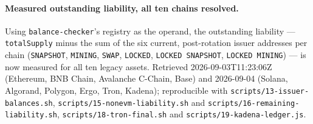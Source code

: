 \paragraph{Measured outstanding liability, all ten chains resolved.} Using \texttt{balance-\allowbreak{}checker}'s
registry as the operand, the outstanding liability --- \texttt{totalSupply} minus the sum of the six
current, post-rotation issuer addresses per chain (\texttt{SNAPSHOT}, \texttt{MINING},
\texttt{SWAP}, \texttt{LOCKED}, \texttt{LOCKED SNAPSHOT}, \texttt{LOCKED MINING}) --- is now measured
for all ten legacy assets. Retrieved
2026-09-03T11:23:06Z (Ethereum, BNB Chain, Avalanche C-Chain, Base) and 2026-09-04 (Solana, Algorand, Polygon, Ergo, Tron, Kadena); reproducible
with \texttt{scripts/\allowbreak{}13-issuer-balances.\allowbreak{}sh}, \texttt{scripts/\allowbreak{}15-nonevm-liability.\allowbreak{}sh} and
\texttt{scripts/\allowbreak{}16-remaining-liability.\allowbreak{}sh},
\texttt{scripts/\allowbreak{}18-tron-final.\allowbreak{}sh} and \texttt{scripts/\allowbreak{}19-kadena-ledger.\allowbreak{}js}.

